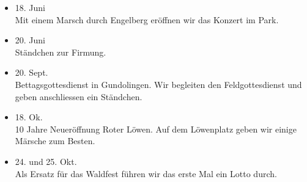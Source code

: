 \begin{history}
\begin{itemize}
        \item[]18. Juni\\
        Mit einem Marsch durch Engelberg eröffnen wir das Konzert im Park.

        \item[]20. Juni\\
        Ständchen zur Firmung.

        \item[]20. Sept.\\
        Bettagsgottesdienst in Gundolingen. Wir begleiten den Feldgottesdienst
        und geben anschliessen ein Ständchen.

        \item[]18. Ok.\\
        10 Jahre Neueröffnung Roter Löwen. Auf dem Löwenplatz geben wir einige
        Märsche zum Besten.

        \item[]24. und 25. Okt.\\
        Als Ersatz für das Waldfest führen wir das erste Mal ein Lotto durch.


    \end{itemize}

\end{history}
